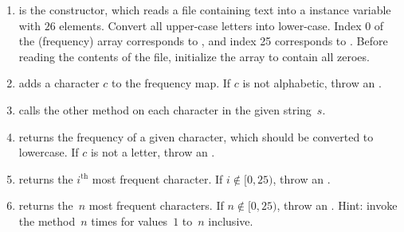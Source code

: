 

\begin{enumerate}[label=(\alph*)]
    \item {} is the constructor, which reads a file containing text into a  instance variable with $26$ elements. Convert all upper-case letters into lower-case. Index 0 of the (frequency) array corresponds to , and index 25 corresponds to . Before reading the contents of the file, initialize the array to contain all zeroes.
    \item {} adds a character $c$ to the frequency map. If $c$ is not alphabetic, throw an .
    \item {} calls the other  method on each character in the given string~$s$.
    \item {} returns the frequency of a given character, which should be converted to lowercase. If $c$ is not a letter, throw an .
    \item {} returns the $i^\text{th}$ most frequent character. If $i \not\in [0, 25)$, throw an .
    \item {} returns the~$n$ most frequent characters. If $n \not\in [0, 25)$, throw an . Hint: invoke the  method~$n$ times for values~$1$ to~$n$ inclusive.
\end{enumerate}

